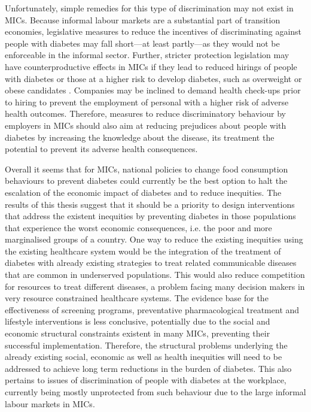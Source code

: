 Unfortunately, simple remedies for this type of discrimination may not exist in \acp{MIC}. Because informal labour markets are a substantial part of transition economies, legislative measures to reduce the incentives of discriminating against people with diabetes may fall short---at least partly---as they would not be enforceable in the informal sector. Further, stricter protection legislation may have counterproductive effects in \acp{MIC} if they lead to reduced hirings of people with diabetes or those at a higher risk to develop diabetes, such as overweight or obese candidates \parencite{Muravyev2014}. Companies may be inclined to demand health check-ups prior to hiring to prevent the employment of personal with a higher risk of adverse health outcomes. Therefore, measures to reduce discriminatory behaviour by employers in \acp{MIC} should also aim at reducing prejudices about people with diabetes by increasing the knowledge about the disease, its treatment the potential to prevent its adverse health consequences.


Overall it seems that for \acp{MIC}, national policies to change food consumption behaviours to prevent diabetes could currently be the best option to halt the escalation of the economic impact of diabetes and to reduce inequities. The results of this thesis suggest that it should be a priority to design interventions that address the existent inequities by preventing diabetes in those populations that experience the worst economic consequences, i.e. the poor and more marginalised groups of a country. One way to reduce the existing inequities using the existing healthcare system would be the integration of the treatment of diabetes with already existing strategies to treat related communicable diseases that are common in underserved populations. This would also reduce competition for resources to treat different diseases, a problem facing many decision makers in very resource constrained healthcare systems. The evidence base for the effectiveness of screening programs, preventative pharmacological treatment and lifestyle interventions is less conclusive, potentially due to the social and economic structural constraints existent in many \acp{MIC}, preventing their successful implementation. Therefore, the structural problems underlying the already existing social, economic as well as health inequities will need to be addressed to achieve long term reductions in the burden of diabetes. This also pertains to issues of discrimination of people with diabetes at the workplace, currently being mostly unprotected from such behaviour due to the large informal labour markets in \acp{MIC}.



